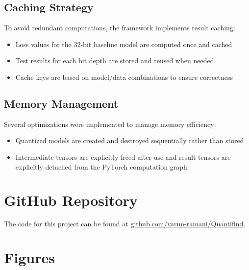 \documentclass[twocolumn]{article}
\begin{document}
\subsection{Caching Strategy}
To avoid redundant computations, the framework implements result caching:
\begin{itemize}
\item Loss values for the 32-bit baseline model are computed once and cached
\item Test results for each bit depth are stored and reused when needed
\item Cache keys are based on model/data combinations to ensure correctness
\end{itemize}
\subsection{Memory Management}
Several optimizations were implemented to manage memory efficiency:
\begin{itemize}
\item Quantized models are created and destroyed sequentially rather than stored
\item Intermediate tensors are explicitly freed after use and result tensors are
explicitly detached from the PyTorch computation graph.
\end{itemize}

\section{GitHub Repository}
The code for this project can be found at \href{https://github.com/varun-ramani/Quantifind}{github.com/varun-ramani/Quantifind}.

\clearpage
\onecolumn

\section{Figures}
\end{document}
